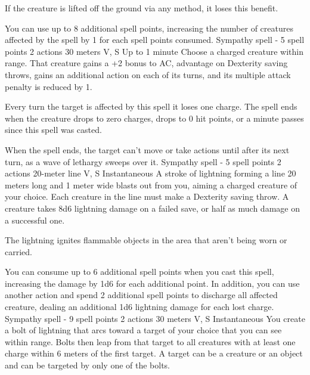         If the creature is lifted off the ground via any method, it loses this benefit.

        You can use up to 8 additional spell points, increasing the number of creatures affected by the spell by 1 for each spell points consumed.
        {Sympathy spell - 5 spell points}
        {2 actions}
        {30 meters}
        {V, S}
        {Up to 1 minute}
        Choose a charged creature within range.
        That creature gains a +2 bonus to AC, advantage on Dexterity saving throws, gains an additional action on each of its turns, and its multiple attack penalty is reduced by 1.

        Every turn the target is affected by this spell it loses one charge.
        The spell ends when the creature drops to zero charges, drops to 0 hit points, or a minute passes since this spell was casted.

        When the spell ends, the target can't move or take actions until after its next turn, as a wave of lethargy sweeps over it.
        {Sympathy spell - 5 spell points}
        {2 actions}
        {20-meter line}
        {V, S}
        {Instantaneous}
        A stroke of lightning forming a line 20 meters long and 1 meter wide blasts out from you, aiming a charged creature of your choice.
        Each creature in the line must make a Dexterity saving throw.
        A creature takes 8d6 lightning damage on a failed save, or half as much damage on a successful one.

        The lightning ignites flammable objects in the area that aren't being worn or carried.

        You can consume up to 6 additional spell points when you cast this spell, increasing the damage by 1d6 for each additional point.
        In addition, you can use another action and spend 2 additional spell points to discharge all affected creature, dealing an additional 1d6 lightning damage for each lost charge.
        {Sympathy spell - 9 spell points}
        {2 actions}
        {30 meters}
        {V, S}
        {Instantaneous}
        You create a bolt of lightning that arcs toward a target of your choice that you can see within range.
        Bolts then leap from that target to all creatures with at least one charge within 6 meters of the first target.
        A target can be a creature or an object and can be targeted by only one of the bolts.

